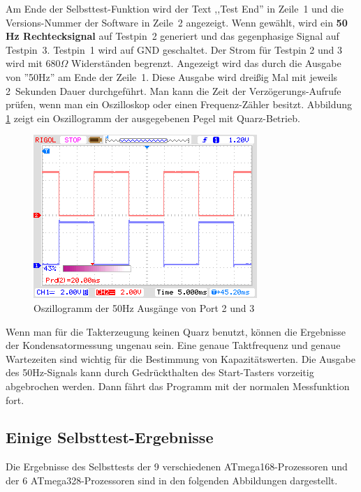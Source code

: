 Am Ende der Selbsttest-Funktion wird der Text ,,Test End'' in Zeile~1 und die Versions-Nummer der Software in Zeile~2 angezeigt.
Wenn gewählt, wird ein {\bf 50 Hz Rechtecksignal} auf Testpin~2 generiert und das gegenphasige Signal auf Testpin~3.
Testpin~1 wird auf GND geschaltet. Der Strom für Testpin 2 und 3 wird mit \(680\Omega\) Widerständen begrenzt.
Angezeigt wird das durch die Ausgabe von ''50Hz'' am Ende der Zeile~1.
Diese Ausgabe wird dreißig Mal mit jeweils 2~Sekunden Dauer durchgeführt.
Man kann die Zeit der Verzögerungs-Aufrufe prüfen, wenn man ein Oszilloskop oder einen
Frequenz-Zähler besitzt. Abbildung \ref{fig:Frequency50} zeigt ein Oszillogramm der ausgegebenen Pegel mit Quarz-Betrieb.

\begin{figure}[H]
\centering
\includegraphics[]{../PNG/Frequency50.png}
\caption{Oszillogramm der 50Hz Ausgänge von Port 2 und 3}
\label{fig:Frequency50}
\end{figure}

Wenn man für die Takterzeugung keinen Quarz benutzt, können die
Ergebnisse der Kondensatormessung ungenau sein.
Eine genaue Taktfrequenz und genaue Wartezeiten sind wichtig für die Bestimmung von Kapazitätswerten.
Die Ausgabe des 50Hz-Signals kann durch Gedrückthalten des Start-Tasters vorzeitig abgebrochen werden.
Dann fährt das Programm mit der normalen Messfunktion fort.

\subsection{Einige Selbsttest-Ergebnisse}

Die Ergebnisse des Selbsttests der 9 verschiedenen ATmega168-Prozessoren und der 6 ATmega328-Prozessoren
sind in den folgenden Abbildungen dargestellt. 

